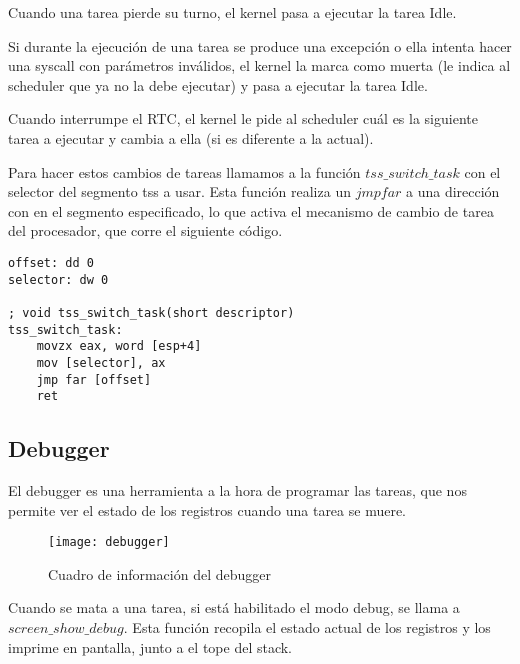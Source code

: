 Cuando una tarea pierde su turno, el kernel pasa a ejecutar la tarea Idle.

Si durante la ejecución de una tarea se produce una excepción
o ella intenta hacer una syscall con parámetros inválidos,
el kernel la marca como muerta (le indica al scheduler que ya no la debe ejecutar)
y pasa a ejecutar la tarea Idle.

Cuando interrumpe el RTC, el kernel le pide al scheduler cuál es la siguiente tarea
a ejecutar y cambia a ella (si es diferente a la actual).

Para hacer estos cambios de tareas llamamos a la función $tss\_switch\_task$ con el
selector del segmento tss a usar. Esta función realiza un $jmp far$ a una dirección
con en el segmento especificado, lo que activa el mecanismo de cambio de tarea del
procesador, que corre el siguiente código.

\begin{lstlisting}
offset: dd 0
selector: dw 0

; void tss_switch_task(short descriptor)
tss_switch_task:
    movzx eax, word [esp+4]
    mov [selector], ax
    jmp far [offset]
    ret
\end{lstlisting}

\subsection{Debugger}
\label{dbg}
El debugger es una herramienta a la hora de programar las tareas, que nos permite ver el estado
de los registros cuando una tarea se muere.

\begin{figure}[H]
    \centering
    \texttt{[image: debugger]}
    \caption{Cuadro de información del debugger}
    \label{fig:gates}
\end{figure}

Cuando se mata a una tarea, si está habilitado el modo debug,
se llama a $screen\_show\_debug$.
Esta función recopila el estado actual de los registros y los imprime en pantalla,
junto a el tope del stack.
